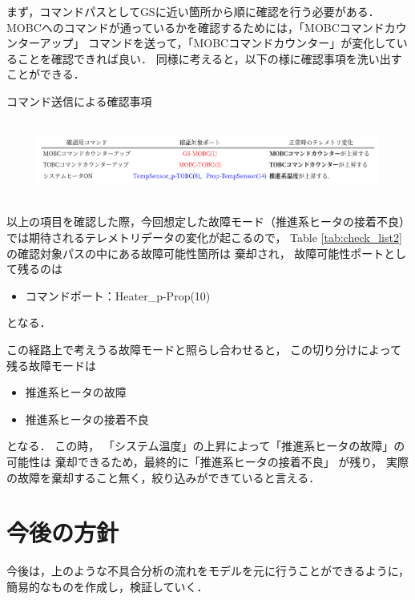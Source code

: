 \documentclass[11pt]{article}
\begin{document}
まず，コマンドパスとしてGSに近い箇所から順に確認を行う必要がある．
MOBCへのコマンドが通っているかを確認するためには，「MOBCコマンドカウンターアップ」
コマンドを送って，「MOBCコマンドカウンター」が変化していることを確認できれば良い．
同様に考えると，以下の様に確認事項を洗い出すことができる．
\begin{table}[H]
   \centering
   \caption{コマンド送信による確認事項} 
   \label{tab:check_list2}
\end{table}
\vspace{-2zh}
\begin{figure}[H]
   \centering
      \includegraphics[height=2.6cm]{figure/check_list.png}
\end{figure}
以上の項目を確認した際，今回想定した故障モード（推進系ヒータの接着不良）
では期待されるテレメトリデータの変化が起こるので，
Table \ref{tab:check_list2}の確認対象パスの中にある故障可能性箇所は
棄却され，
故障可能性ポートとして残るのは
\begin{itemize}
   \item コマンドポート：Heater\_p-Prop(10)
\end{itemize}
となる．


この経路上で考えうる故障モードと照らし合わせると，
この切り分けによって残る故障モードは
\begin{itemize}
   \item 推進系ヒータの故障
   \item 推進系ヒータの接着不良
\end{itemize}
となる．
この時，
「システム温度」の上昇によって「推進系ヒータの故障」の可能性は
棄却できるため，最終的に「推進系ヒータの接着不良」
が残り，
実際の故障を棄却すること無く，絞り込みができていると言える．\\
\section{今後の方針}
今後は，上のような不具合分析の流れをモデルを元に行うことができるように，
簡易的なものを作成し，検証していく．
\end{document}
